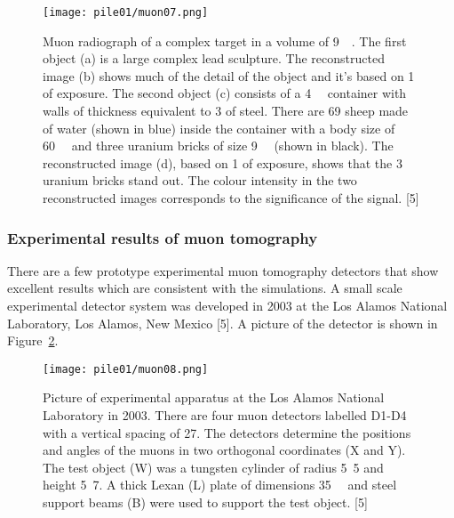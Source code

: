 \documentclass[twocolumn,a4paper]{article}
\begin{document}
\begin{figure}
  \texttt{[image: pile01/muon07.png]}
  \caption{Muon radiograph of a complex target in a volume of
    \unit{9}{\cubic\metre}. The first object (a) is a
    large complex lead sculpture. The reconstructed image (b) shows
    much of the detail of the object and it’s based on
    \unit{1}{\minute} of exposure. The second object (c) consists of a
    \unit{4}{\cubic\metre} container with walls of
    thickness equivalent to \unit{3}{\milli\metre} of steel. There are
    69 sheep made of water (shown in blue) inside the container with a
    body size of \unit{60}{\cubic{\centi\metre}} and
    three uranium bricks of size
    \unit{9}{\cubic{\centi\metre}} (shown in
    black). The reconstructed image (d), based on \unit{1}{\minute} of
    exposure, shows that the 3 uranium bricks stand out. The colour
    intensity in the two reconstructed images corresponds to the
    significance of the signal. [5]}
  \label{fig:muon07}
\end{figure}

\subsubsection{Experimental results of muon tomography}
There are a few prototype experimental muon tomography detectors that
show excellent results which are consistent with the simulations.  A
small scale experimental detector system was developed in 2003 at the
Los Alamos National Laboratory, Los Alamos, New Mexico [5]. A picture
of the detector is shown in Figure~\ref{fig:muon08}.

\begin{figure}
  \texttt{[image: pile01/muon08.png]}
  \caption{Picture of experimental apparatus at the Los Alamos
    National Laboratory in 2003. There are four muon detectors
    labelled D1-D4 with a vertical spacing of
    \unit{27}{\centi\metre}. The detectors determine the positions and
    angles of the muons in two orthogonal coordinates (X and Y). The
    test object (W) was a tungsten cylinder of radius
    \unit{5.5}{\centi\metre} and height \unit{5.7}{\centi\metre}. A
    thick Lexan (L) plate of dimensions
    \unit{35}{\cubic{\centi\metre}} and steel support
    beams (B) were used to support the test object. [5]}
  \label{fig:muon08}
\end{figure}
\end{document}
